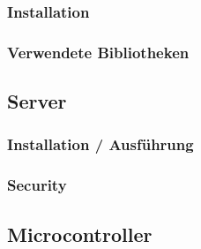         \subsubsection{Installation}
        \subsubsection{Verwendete Bibliotheken}

\subsection{Server}
    
    \subsubsection{Installation / Ausführung}
    \subsubsection{Security}

\subsection{Microcontroller}
    
    